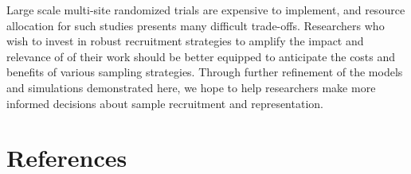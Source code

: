 \documentclass[
  man,floatsintext]{apa6}
\begin{document}
Large scale multi-site randomized trials are expensive to implement, and resource allocation for such studies presents many difficult trade-offs. Researchers who wish to invest in robust recruitment strategies to amplify the impact and relevance of of their work should be better equipped to anticipate the costs and benefits of various sampling strategies. Through further refinement of the models and simulations demonstrated here, we hope to help researchers make more informed decisions about sample recruitment and representation.

\newpage

\hypertarget{references}{%
\section*{References}\label{references}}

\begingroup
\setlength{\parindent}{-0.5in}
\end{document}
